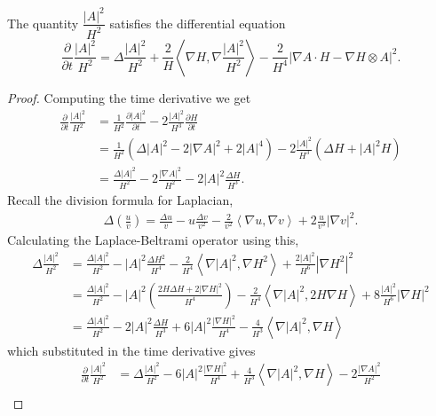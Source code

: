 \begin{lemma}\label{Deltag1}
    The quantity $ \dfrac{|A|^{2}}{H^{2}} $ satisfies the differential equation 
    \begin{equation}
        \frac{\partial}{ \partial t} \frac{|A|^{2}}{H^{2}} = \Delta \frac{|A|^{2}}{H^{2}}+ \frac{2}{H} \left< \nabla H , \nabla \frac{ |A|^{2}}{H^{2}}\right>  - \frac{2}{H^{4}}|\nabla A \cdot H - \nabla H \otimes A|^{2}. 
    \end{equation}
\end{lemma}
\begin{proof}
    Computing the time derivative we get 
    \begin{align*}
        \frac{\partial}{ \partial t} \frac{|A|^{2}}{H^{2}} & = \frac{1}{H^{2}} \frac{ \partial |A|^{2} }{ \partial t} - 2\frac{|A|^{2}}{H^{3}} \frac{ \partial H}{ \partial t}\\
        & = \frac{1}{H^{2}}\left( \Delta |A|^{2} - 2|\nabla A|^{2}+2|A|^{4}\right) - 2 \frac{|A|^{2}}{H^{3}}\left( \Delta  H + |A|^{2}H\right)\\
        & = \frac{\Delta |A|^{2}}{H^{2}} - 2 \frac{|\nabla A|^{2}}{H^{2}} - 2|A|^{2} \frac{\Delta H}{H^{3}} .
    \end{align*}
    Recall the division formula for Laplacian, \begin{align*}
        \Delta\left(\frac{u}{v}\right) = \frac{\Delta u}{v} - u \frac{\Delta v}{v^{2}} - \frac{2}{v^{2}}\left< \nabla u, \nabla v \right> + 2 \frac{u}{v^{3}}|\nabla v|^{2}.
    \end{align*}
    Calculating the Laplace-Beltrami operator using this, \begin{align*}
        \Delta \frac{|A|^{2}}{H^{2}} & = \frac{\Delta |A|^{2}}{H^{2}} - |A|^{2}\frac{ \Delta H^{2}}{H^{4}} - \frac{2}{H^{4}} \left< \nabla |A|^{2}, \nabla H^{2} \right> + \frac{2|A|^{2}}{H^{6}}|\nabla H^{2}|^{2}\\
        & = \frac{\Delta |A|^{2}}{H^{2}} - |A|^{2} \left( \frac{2H \Delta H+ 2| \nabla H|^{2}}{H^{4}} \right)- \frac{2}{H^{4}}\left< \nabla |A|^{2}, 2H \nabla H \right> + 8 \frac{|A|^{2}}{H^{6}}|\nabla H|^{2}\\
        & = \frac{\Delta |A|^{2}}{{H^{2}}} - 2|A|^{2} \frac{\Delta H}{H^{3}} + 6|A|^{2} \frac{| \nabla H|^{2}}{H^{4}} - \frac{4}{H^{3}}\left< \nabla |A|^{2}, \nabla H \right>
    \end{align*}
    which substituted in the time derivative gives \begin{align*}
        \frac{\partial}{ \partial t} \frac{|A|^{2}}{H^{2}} & = \Delta \frac{|A|^{2}}{H^{2}}  - 6|A|^{2} \frac{| \nabla H|^{2}}{H^{4}} + \frac{4}{H^{3}}\left< \nabla |A|^{2}, \nabla H \right> -2 \frac{|\nabla A|^{2}}{H^{2}}\\

\end{align*}
\end{proof}
